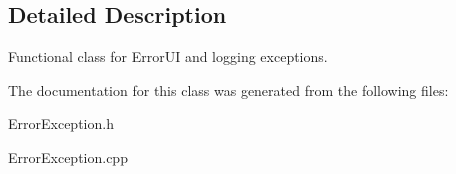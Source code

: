 \subsection{Detailed Description}
Functional class for Error\-UI and logging exceptions. 



The documentation for this class was generated from the following files:\begin{CompactItemize}
\item 
Error\-Exception.h\item 
Error\-Exception.cpp\end{CompactItemize}
